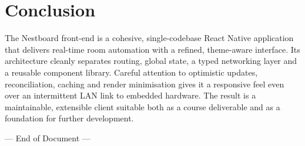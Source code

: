 \documentclass[11pt,a4paper]{article}
\begin{document}
\section{Conclusion}

The Nestboard front-end is a cohesive, single-codebase React Native application
that delivers real-time room automation with a refined, theme-aware interface.
Its architecture cleanly separates routing, global state, a typed networking
layer and a reusable component library. Careful attention to optimistic updates,
reconciliation, caching and render minimisation gives it a responsive feel even
over an intermittent LAN link to embedded hardware. The result is a
maintainable, extensible client suitable both as a course deliverable and as a
foundation for further development.

\vspace{1cm}
\begin{center}
\color{muted}\small — End of Document —
\end{center}
\end{document}
